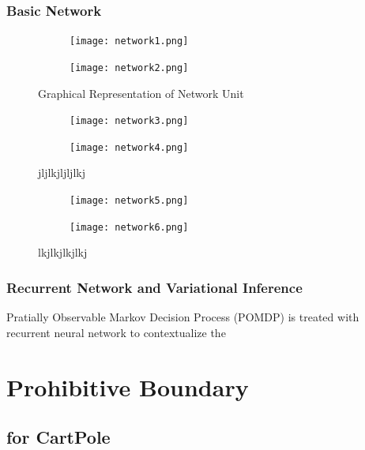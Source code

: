 \documentclass[journal]{IEEEtran}
\begin{document}
\subsubsection{Basic Network}

\begin{figure}[H]
\centering
\begin{subfigure}{0.25\textwidth}
  \centering
  \texttt{[image: network1.png]}
\end{subfigure}%
\begin{subfigure}{.25\textwidth}
  \centering
  \texttt{[image: network2.png]}
\end{subfigure}
\caption{Graphical Representation of Network Unit}
\label{fig:combine}
\end{figure}

\begin{figure}[H]
\centering
\begin{subfigure}{0.25\textwidth}
  \centering
  \texttt{[image: network3.png]}
\end{subfigure}%
\begin{subfigure}{.25\textwidth}
  \centering
  \texttt{[image: network4.png]}
\end{subfigure}
\caption{jljlkjljljlkj }
\label{fig:combine}
\end{figure}

\begin{figure}[H]
\centering
\begin{subfigure}{0.25\textwidth}
  \centering
  \texttt{[image: network5.png]}
\end{subfigure}%
\begin{subfigure}{.25\textwidth}
  \centering
  \texttt{[image: network6.png]}
\end{subfigure}
\caption{lkjlkjlkjlkj}
\label{fig:combine}
\end{figure}

\subsubsection{Recurrent Network and Variational Inference}
Pratially Observable Markov Decision Process (POMDP) is treated with recurrent neural network to contextualize the




\section{Prohibitive Boundary}

\subsection{for CartPole}
\end{document}
